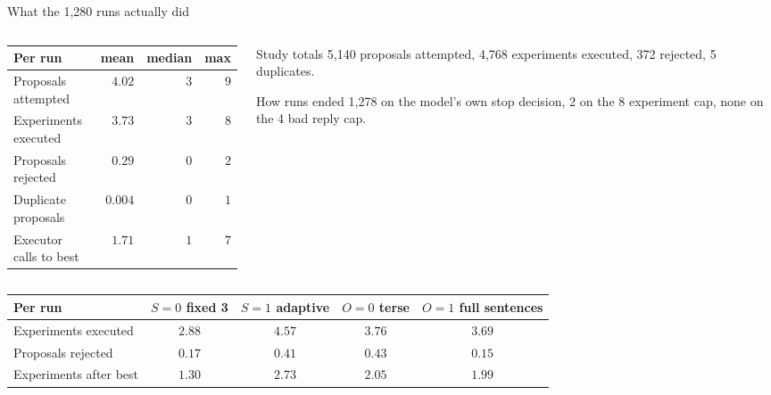 \documentclass[aspectratio=169,11pt]{beamer}
\begin{document}
\begin{frame}{What the 1{,}280 runs actually did}
  \small
  \begin{columns}[T]
    \begin{column}{0.55\textwidth}
      \begin{tabular}{@{}lrrr@{}}
        \toprule
        Per run & mean & median & max\\
        \midrule
        Proposals attempted    & $4.02$  & $3$ & $9$\\
        Experiments executed   & $3.73$  & $3$ & $8$\\
        Proposals rejected     & $0.29$  & $0$ & $2$\\
        Duplicate proposals    & $0.004$ & $0$ & $1$\\
        Executor calls to best & $1.71$  & $1$ & $7$\\
        \bottomrule
      \end{tabular}
    \end{column}
    \begin{column}{0.43\textwidth}
      \begin{block}{Study totals}
        \scriptsize
        5{,}140 proposals attempted, 4{,}768 experiments executed,
        372 rejected, 5 duplicates.
      \end{block}
      \vspace{-0.15cm}
      \begin{block}{How runs ended}
        \scriptsize
        1{,}278 on the model's own stop decision, 2 on the 8 experiment cap,
        none on the 4 bad reply cap.
      \end{block}
    \end{column}
  \end{columns}
  \vfill
  \begin{center}
  \scriptsize
  \begin{tabular}{@{}lcccc@{}}
    \toprule
    Per run & $S=0$ fixed 3 & $S=1$ adaptive & $O=0$ terse & $O=1$ full sentences\\
    \midrule
    Experiments executed   & $2.88$ & $4.57$ & $3.76$ & $3.69$\\
    Proposals rejected     & $0.17$ & $0.41$ & $0.43$ & $0.15$\\
    Experiments after best & $1.30$ & $2.73$ & $2.05$ & $1.99$\\
    \bottomrule
  \end{tabular}
  \end{center}
\end{frame}
\end{document}
